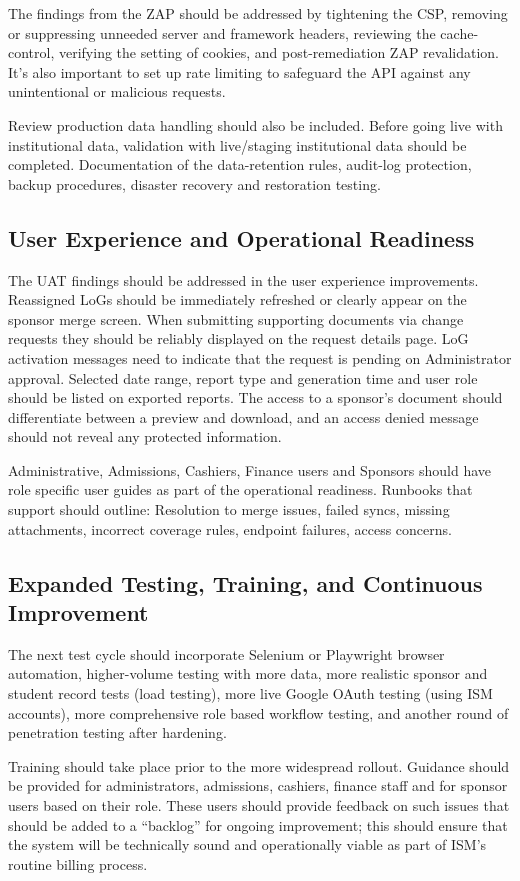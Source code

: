 The findings from the ZAP should be addressed by tightening the CSP, removing or suppressing unneeded server and framework headers, reviewing the cache-control, verifying the setting of cookies, and post-remediation ZAP revalidation. It's also important to set up rate limiting to safeguard the API against any unintentional or malicious requests.

Review production data handling should also be included. Before going live with institutional data, validation with live/staging institutional data should be completed. Documentation of the data-retention rules, audit-log protection, backup procedures, disaster recovery and restoration testing.

\subsection{User Experience and Operational Readiness}

The UAT findings should be addressed in the user experience improvements. Reassigned LoGs should be immediately refreshed or clearly appear on the sponsor merge screen. When submitting supporting documents via change requests they should be reliably displayed on the request details page. LoG activation messages need to indicate that the request is pending on Administrator approval. Selected date range, report type and generation time and user role should be listed on exported reports. The access to a sponsor's document should differentiate between a preview and download, and an access denied message should not reveal any protected information.

Administrative, Admissions, Cashiers, Finance users and Sponsors should have role specific user guides as part of the operational readiness. Runbooks that support should outline: Resolution to merge issues, failed syncs, missing attachments, incorrect coverage rules, endpoint failures, access concerns.

\subsection{Expanded Testing, Training, and Continuous Improvement}

The next test cycle should incorporate Selenium or Playwright browser automation, higher-volume testing with more data, more realistic sponsor and student record tests (load testing), more live Google OAuth testing (using ISM accounts), more comprehensive role based workflow testing, and another round of penetration testing after hardening.

Training should take place prior to the more widespread rollout. Guidance should be provided for administrators, admissions, cashiers, finance staff and for sponsor users based on their role. These users should provide feedback on such issues that should be added to a “backlog” for ongoing improvement; this should ensure that the system will be technically sound and operationally viable as part of ISM's routine billing process.
